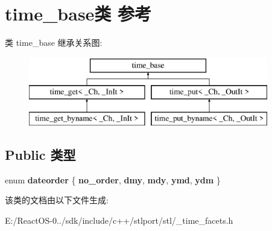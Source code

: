 \hypertarget{classtime__base}{}\section{time\+\_\+base类 参考}
\label{classtime__base}
类 time\+\_\+base 继承关系图\+:\begin{figure}[H]
\begin{center}
\leavevmode
\includegraphics[height=3.000000cm]{classtime__base}
\end{center}
\end{figure}
\subsection*{Public 类型}
\begin{DoxyCompactItemize}
\item 
\mbox{\label{classtime__base_a76da45573f5841903fab983174a2de33}} 
enum {\bfseries dateorder} \{ \newline
{\bfseries no\+\_\+order}, 
{\bfseries dmy}, 
{\bfseries mdy}, 
{\bfseries ymd}, 
\newline
{\bfseries ydm}
 \}
\end{DoxyCompactItemize}


该类的文档由以下文件生成\+:\begin{DoxyCompactItemize}
\item 
E\+:/\+React\+O\+S-\/0../sdk/include/c++/stlport/stl/\+\_\+time\+\_\+facets.\+h\end{DoxyCompactItemize}
